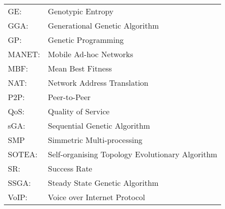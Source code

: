 \begin{tabular*}{\textwidth}
{@{\extracolsep{\fill}}ll}

GE:		&	Genotypic Entropy\\

GGA:	&	Generational Genetic Algorithm \\

GP:		&	Genetic Programming \\

MANET:	&	Mobile Ad-hoc Networks\\

MBF:	&	Mean Best Fitness\\

NAT:	&	Network Address Translation\\

P2P:	&	Peer-to-Peer\\

QoS:	&	Quality of Service\\

sGA:	&	Sequential Genetic Algorithm\\

SMP		&	Simmetric Multi-processing\\

SOTEA:	&	Self-organising Topology Evolutionary Algorithm\\

SR:		&	Success Rate\\

SSGA:	&	Steady State Genetic Algorithm\\

VoIP:	&	Voice over Internet Protocol\\

\end{tabular*}

%